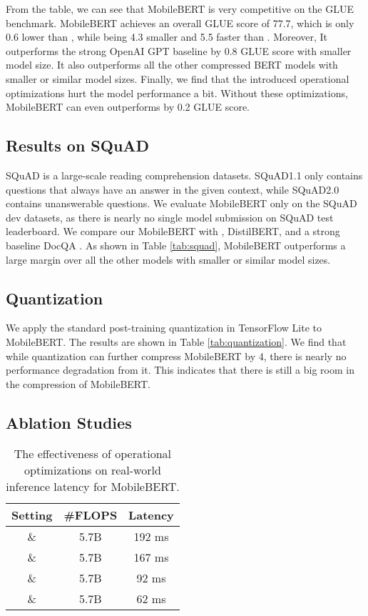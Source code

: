 \documentclass[11pt,a4paper]{article}
\begin{document}
From the table, we can see that MobileBERT is very competitive on the GLUE benchmark. MobileBERT achieves an overall GLUE score of 77.7, which is only 0.6 lower than , while being 4.3 smaller and 5.5 faster than . Moreover, It outperforms the strong OpenAI GPT baseline by 0.8 GLUE score with  smaller model size. It also outperforms all the other compressed BERT models with smaller or similar model sizes.
Finally, we find that the introduced operational optimizations hurt the model performance a bit. Without these optimizations, MobileBERT can even outperforms  by 0.2 GLUE score.


\subsection{Results on SQuAD}

SQuAD is a large-scale reading comprehension datasets. SQuAD1.1 \citep{rajpurkar2016squad} only contains questions that always have an answer in the given context, while SQuAD2.0 \citep{rajpurkar2018know} contains unanswerable questions. 
We evaluate MobileBERT only on the SQuAD dev datasets, as there is nearly no single model submission on SQuAD test leaderboard. We compare our MobileBERT with , DistilBERT, and a strong baseline DocQA \citep{clark2017simple}. As shown in Table \ref{tab:squad}, MobileBERT outperforms a large margin over all the other models with smaller or similar model sizes.




\subsection{Quantization}

We apply the standard post-training quantization in TensorFlow Lite to MobileBERT. The results are shown in Table \ref{tab:quantization}. We find that while quantization can further compress MobileBERT by 4, there is nearly no performance degradation from it. This indicates that there is still a big room in the compression of MobileBERT.

\subsection{Ablation Studies}


\begin{table}[t]
	\begin{center}
	    \small
		\begin{tabular}{ c  c  c }
		    \hline
		    \textbf{Setting} & \textbf{\#FLOPS} & \textbf{Latency}\\
			\hline
              \&  & 5.7B & 192 ms\\
              \&  & 5.7B & 167 ms\\
              \&  & 5.7B & 92 ms\\
              \&  & 5.7B & 62 ms\\
            \hline
		\end{tabular}
	\end{center}
	\caption{The effectiveness of operational optimizations on real-world inference latency for MobileBERT.}
	\label{tab:latency}
\end{table}
\end{document}
